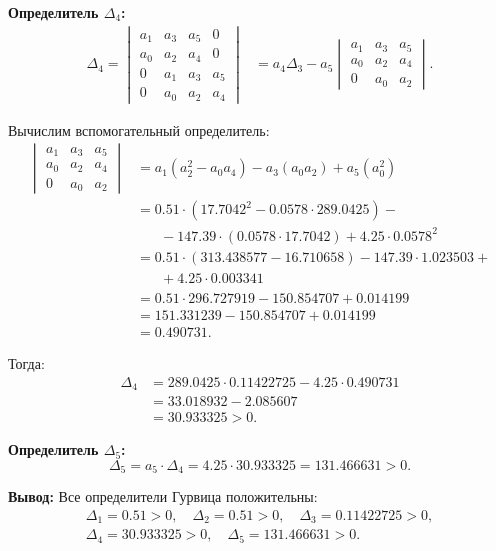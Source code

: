 \textbf{Определитель $\Delta_4$:}
\begin{align*}
\Delta_4 = \begin{vmatrix}
a_1 & a_3 & a_5 & 0 \\
a_0 & a_2 & a_4 & 0 \\
0 & a_1 & a_3 & a_5 \\
0 & a_0 & a_2 & a_4
\end{vmatrix} &= a_4 \Delta_3 - a_5 \begin{vmatrix}
a_1 & a_3 & a_5 \\
a_0 & a_2 & a_4 \\
0 & a_0 & a_2
\end{vmatrix}.
\end{align*}

Вычислим вспомогательный определитель:
\begin{align*}
\begin{vmatrix}
a_1 & a_3 & a_5 \\
a_0 & a_2 & a_4 \\
0 & a_0 & a_2
\end{vmatrix} &= a_1(a_2^2 - a_0 a_4) - a_3(a_0 a_2) + a_5(a_0^2)\\
&= 0.51 \cdot (17.7042^2 - 0.0578 \cdot 289.0425) - \\
&\phantom{= (} - 147.39 \cdot (0.0578 \cdot 17.7042) + 4.25 \cdot 0.0578^2 \\
&= 0.51 \cdot (313.438577 - 16.710658) - 147.39 \cdot 1.023503 + \\
&\phantom{= (} + 4.25 \cdot 0.003341 \\
&= 0.51 \cdot 296.727919 - 150.854707 + 0.014199 \\
&= 151.331239 - 150.854707 + 0.014199 \\
&= 0.490731.
\end{align*}

Тогда:
\begin{align*}
\Delta_4 &= 289.0425 \cdot 0.11422725 - 4.25 \cdot 0.490731 \\
&= 33.018932 - 2.085607 \\
&= 30.933325 > 0.
\end{align*}

\textbf{Определитель $\Delta_5$:}
\[
\Delta_5 = a_5 \cdot \Delta_4 = 4.25 \cdot 30.933325 = 131.466631 > 0.
\]

\textbf{Вывод:} Все определители Гурвица положительны:
\begin{gather*}
\Delta_1 = 0.51 > 0, \quad \Delta_2 = 0.51 > 0, \quad \Delta_3 = 0.11422725 > 0, \\
\Delta_4 = 30.933325 > 0, \quad \Delta_5 = 131.466631 > 0.
\end{gather*}

